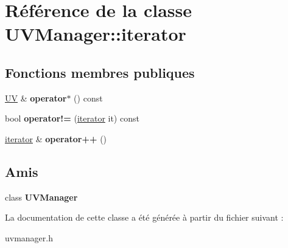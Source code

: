 \hypertarget{class_u_v_manager_1_1iterator}{\section{Référence de la classe U\+V\+Manager\+:\+:iterator}
\label{class_u_v_manager_1_1iterator}
}
\subsection*{Fonctions membres publiques}
\begin{DoxyCompactItemize}
\item 
\hypertarget{class_u_v_manager_1_1iterator_aba2cf7041889369cada80deae4610c41}{\hyperlink{class_u_v}{U\+V} \& {\bfseries operator$\ast$} () const }\label{class_u_v_manager_1_1iterator_aba2cf7041889369cada80deae4610c41}

\item 
\hypertarget{class_u_v_manager_1_1iterator_ac3c9ff57c41e30982cf1d14fe98d1572}{bool {\bfseries operator!=} (\hyperlink{class_u_v_manager_1_1iterator}{iterator} it) const }\label{class_u_v_manager_1_1iterator_ac3c9ff57c41e30982cf1d14fe98d1572}

\item 
\hypertarget{class_u_v_manager_1_1iterator_a9f5057184b78bd6d3298251f282e5a90}{\hyperlink{class_u_v_manager_1_1iterator}{iterator} \& {\bfseries operator++} ()}\label{class_u_v_manager_1_1iterator_a9f5057184b78bd6d3298251f282e5a90}

\end{DoxyCompactItemize}
\subsection*{Amis}
\begin{DoxyCompactItemize}
\item 
\hypertarget{class_u_v_manager_1_1iterator_a335ec2026467669b89518b0c67372f3b}{class {\bfseries U\+V\+Manager}}\label{class_u_v_manager_1_1iterator_a335ec2026467669b89518b0c67372f3b}

\end{DoxyCompactItemize}


La documentation de cette classe a été générée à partir du fichier suivant \+:\begin{DoxyCompactItemize}
\item 
uvmanager.\+h\end{DoxyCompactItemize}

